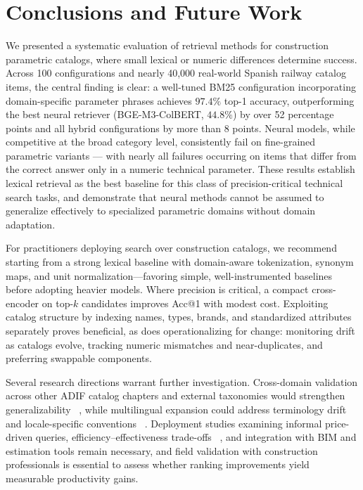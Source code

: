 \documentclass[preprint,12pt]{elsarticle}
\begin{document}
\section{Conclusions and Future Work}

We presented a systematic evaluation of retrieval methods for construction parametric catalogs, where small lexical or numeric differences determine success. Across 100 configurations and nearly 40,000 real-world Spanish railway catalog items, the central finding is clear: a well-tuned BM25 configuration incorporating domain-specific parameter phrases achieves $97.4\%$ top-1 accuracy, outperforming the best neural retriever (BGE-M3-ColBERT, $44.8\%$) by over 52 percentage points and all hybrid configurations by more than 8 points. Neural models, while competitive at the broad category level, consistently fail on fine-grained parametric variants — with nearly all failures occurring on items that differ from the correct answer only in a numeric technical parameter. These results establish lexical retrieval as the best baseline for this class of precision-critical technical search tasks, and demonstrate that neural methods cannot be assumed to generalize effectively to specialized parametric domains without domain adaptation.


For practitioners deploying search over construction catalogs, we recommend starting from a strong lexical baseline with domain-aware tokenization, synonym maps, and unit normalization—favoring simple, well-instrumented baselines before adopting heavier models. Where precision is critical, a compact cross-encoder on top-$k$ candidates improves Acc@1 with modest cost. Exploiting catalog structure by indexing names, types, brands, and standardized attributes separately proves beneficial, as does operationalizing for change: monitoring drift as catalogs evolve, tracking numeric mismatches and near-duplicates, and preferring swappable components.

Several research directions warrant further investigation. Cross-domain validation across other ADIF catalog chapters and external taxonomies would strengthen generalizability ~\cite{royanoAnalysisClassificationSystems2023a}, while multilingual expansion could address terminology drift and locale-specific conventions ~\cite{valentini2024messirve,tang2024we,jungyeon2024cross-lingual}. Deployment studies examining informal price-driven queries, efficiency–effectiveness trade-offs ~\cite{bruch2023analysis}, and integration with BIM and estimation tools remain necessary, and field validation with construction professionals is essential to assess whether ranking improvements yield measurable productivity gains.
\end{document}
